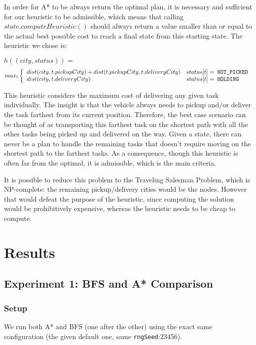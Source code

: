 \documentclass[11pt]{article}
\begin{document}
In order for A* to be always return the optimal plan, it is necessary and
sufficient for our heuristic to be admissible, which means that calling
$state.computeHeuristic()$ should always return a value smaller than or equal to
the actual best possible cost to reach a final state from this starting state.
The heuristic we chose is:


$h((city, status)) =$
\[max_t \left\{
\begin{array}{ll}
	dist(city, t.pickupCity) + dist(t.pickupCity, t.deliveryCity) & status[t] = $\verb| NOT_PICKED|$ \\
	dist(city, t.deliveryCity) & status[t] = $\verb| HOLDING|$ \\
\end{array}
\right.
\]

This heuristic considers the maximum cost of delivering any given task
individually. The insight is that the vehicle always needs to pickup and/or
deliver the task farthest from its current position. Therefore, the best case
scenario can be thought of as transporting this farthest task on the shortest
path with all the other tasks being picked up and delivered on the way. Given a
state, there can never be a plan to handle the remaining tasks that doesn't
require moving on the shortest path to the farthest tasks. As a consequence,
though this heuristic is often far from the optimal, it is admissible,
which is the main criteria.

It is possible to reduce this problem to the Traveling Salesman Problem, which
is NP-complete: the remaining pickup/delivery cities would be the nodes. However
that would defeat the purpose of the heuristic, since computing the solution
would be prohibitively expensive, whereas the heuristic needs to be cheap to
compute.

\section{Results}

\subsection{Experiment 1: BFS and A* Comparison}

\subsubsection{Setup}
We run both A* and BFS (one after the other) using the exact same configuration
(the given default one, same \verb|rngSeed|:23456).
\end{document}
